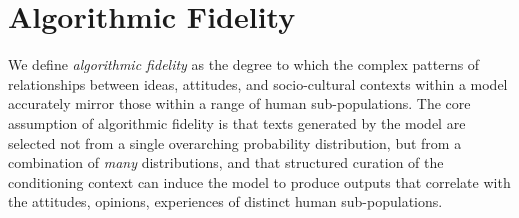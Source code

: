 \documentclass[11pt]{article}
\begin{document}




\section{Algorithmic Fidelity}

We define \textit{algorithmic fidelity} as the degree to which the complex patterns of relationships between ideas, attitudes, and socio-cultural contexts within a model accurately mirror those within a range of human sub-populations. The core assumption of algorithmic fidelity is that texts generated by the model are selected not from a single overarching probability distribution, but from a combination of \textit{many} distributions, and that structured curation of the conditioning context can induce the model to produce outputs that correlate with the attitudes, opinions, experiences of distinct human sub-populations.
\end{document}
